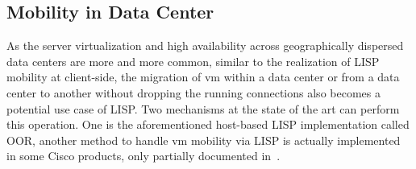 \subsection{Mobility in Data Center}
\label{subsubsec:mobility_DC}
As the server virtualization and high availability across geographically dispersed data centers are more and more common, similar to the realization of LISP mobility at client-side, the migration of \acrfull{vm} within a data center or from a data center to another without dropping the running connections also becomes a potential use case of LISP. Two mechanisms at the state of the art can perform this operation. One is the aforementioned host-based LISP implementation called OOR, another method to handle \acrshort{vm} mobility via LISP is actually implemented in some Cisco products, only partially documented in~\cite{ciscovmmobility}. %



